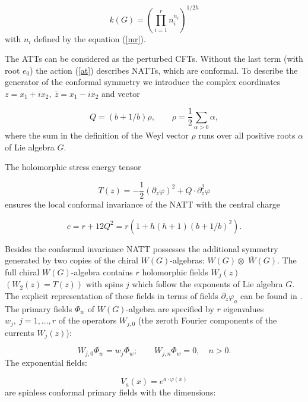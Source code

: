 \documentclass[a4paper,12pt]{article}
\begin{document}
\begin{equation}
k(G)=\left( \prod_{i=1}^rn_i^{n_i}\right) ^{1/2h}  \label{k}
\end{equation}
with $n_i$ defined by the equation (\ref{mr}).

The ATTs can be considered as the perturbed CFTs. Without the last term
(with root $e_0$) the action (\ref{at}) describes NATTs, which are
conformal. To describe the generator of the conformal symmetry we introduce
the complex coordinates $z=x_1+ix_2,\ \bar{z}=x_1-ix_2$ and vector

\begin{equation}
Q=(b+1/b)\rho ,\qquad \rho =\frac 12\sum_{\alpha >0}\alpha ,  \label{q}
\end{equation}
where the sum in the definition of the Weyl vector $\rho $ runs over all
positive roots $\alpha $ of Lie algebra $G.$

The holomorphic stress energy tensor

\begin{equation}
T(z)=-\frac 12(\partial _z\varphi )^2+Q\cdot \partial _z^2\varphi  \label{se}
\end{equation}
ensures the local conformal invariance of the NATT with the central charge

\begin{equation}
c=r+12Q^2=r(1+h(h+1)(b+1/b)^2).  \label{cc}
\end{equation}

Besides the conformal invariance NATT possesses the additional symmetry
generated by two copies of the chiral $W(G)$-algebras: $W(G)\otimes $ $
\overline{W}(G)$. The full chiral $W(G)$-algebra contains $r$ holomorphic
fields $W_j(z)$ $(W_2(z)=T(z))$ with spins $j$ which follow the exponents of
Lie algebra $G.$ The explicit representation of these fields in terms of
fields $\partial _z\varphi _a$ can be found in \cite{FL}. The primary fields 
$\Phi _w$ of $W(G)$-algebra are specified by $r$ eigenvalues $w_j,\
j=1,...,r $ of the operators $W_{j,0}$ (the zeroth Fourier components of the
currents $W_j(z)$):

\begin{equation}
W_{j,0}\Phi _w=w_j\Phi _w;\qquad W_{j,n}\Phi _w=0,\quad n>0.  \label{w}
\end{equation}
The exponential fields:

\begin{equation}
V_a(x)=e^{a\cdot \varphi (x)}  \label{ex}
\end{equation}
are spinless conformal primary fields with the dimensions:
\end{document}
